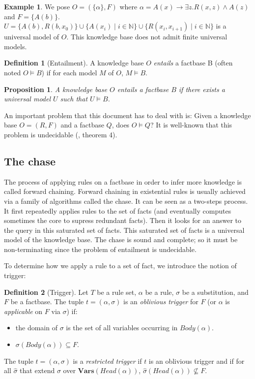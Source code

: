 \documentclass{article}
\newtheorem{proposition}{Proposition}[section]
\theoremstyle{definition}
\newtheorem{definition}{Definition}[section]
\newtheorem{example}{Example}[section]
\theoremstyle{remark}
\def \N {\mathbb N}
\newcommand{\Vars}{\textbf{Vars}}
\begin{document}
\begin{example} We pose $O = (\{\alpha\},F)$ where $\alpha = A(x) \rightarrow \exists z.R(x,z) \wedge A(z)$ and $F = \{A(b)\}$. $U = \{A(b),R(b,x_0)\}\cup \{A(x_i)\mid i \in \N\}\cup \{R(x_i,x_{i+1}) \mid i \in \N\}$ is a universal model of $O$. This knowledge base does not admit finite universal models.
\end{example}

\begin{definition}[Entailment]
A knowledge base $O$ \emph{entails} a factbase B (often noted $O \models B$) if for each model $M$ of $O$, $M \models B$.
\end{definition}




\begin{proposition}
A knowledge base $O$ entails a factbase $B$ if there exists a universal model $U$ such that $U \models B$.
\end{proposition}

An important problem that this document has to deal with is: Given a knowledge base $O=(R,F)$ and a factbase $Q$,  does $O \models Q$? It  is  well-known  that  this  problem  is  undecidable (\cite{NP2}, theorem 4). 



\subsection{The chase}

The process of applying rules on a factbase in order to infer more knowledge is called forward chaining.   Forward  chaining  in  existential  rules  is  usually achieved  via  a  family  of  algorithms  called the  chase. It can be seen as a two-steps process. It first repeatedly applies rules to the set of facts (and eventually computes sometimes the core to supress redundant facts). Then it looks for an answer to the query in this saturated set of facts. This saturated set of facts is a universal model of the knowledge base. The chase is sound and complete; so it must be non-terminating since the problem of entailment is undecidable.

To determine how we apply a rule to a set of fact, we introduce the notion of trigger:

\begin{definition}[Trigger]
Let $T$ be a rule set, $\alpha$ be a rule, $\sigma$ be a substitution, and $F$ be a factbase. The tuple $t = (\alpha,\sigma)$ is an \emph{oblivious trigger} for $F$ (or $\alpha$ is \emph{applicable} on $F$ via $\sigma$) if: 
\begin{itemize}
\item the domain of $\sigma$ is the set of all variables occurring in $Body(\alpha)$.
\item $\sigma(Body(\alpha)) \subseteq F$.
\end{itemize}
The tuple $t = (\alpha,\sigma)$ is a \emph{restricted trigger} if $t$ is an oblivious trigger and if for all $\hat \sigma$ that extend $\sigma$ over $\Vars(\textit{Head}(\alpha))$, $\hat \sigma(Head(\alpha)) \nsubseteq F$.

\end{definition} 
\end{document}
